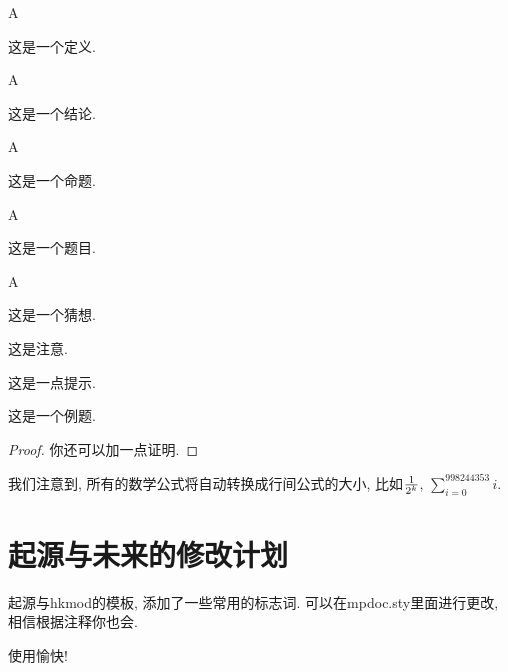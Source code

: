 \documentclass[a4,10pt]{ctexart}
\begin{document}
\begin{dy}{A}{}
        
这是一个定义.
    
\end{dy}

\begin{jl}{A}{}
        
这是一个结论.
    
\end{jl}

\begin{dl}{A}{}
        
这是一个命题.
    
\end{dl}
    
\begin{ti}{A}{}
        
这是一个题目.
    
\end{ti}

\begin{cx}{A}{}
        
这是一个猜想.
    
\end{cx}

\begin{zy}
        
这是注意.
    
\end{zy}

\begin{ts}
        
这是一点提示.
    
\end{ts}

\begin{lt}
        
这是一个例题.
    
\end{lt}

\begin{proof}
你还可以加一点证明. 
\end{proof}

我们注意到, 所有的数学公式将自动转换成行间公式的大小, 比如${1\over 2^k}$, $\sum_{i=0}^{998244353}i$. 

\section{起源与未来的修改计划}

起源与hkmod的模板, 添加了一些常用的标志词. 可以在mpdoc.sty里面进行更改, 相信根据注释你也会. 

使用愉快! 
    
    
    
    
   
\end{document}

